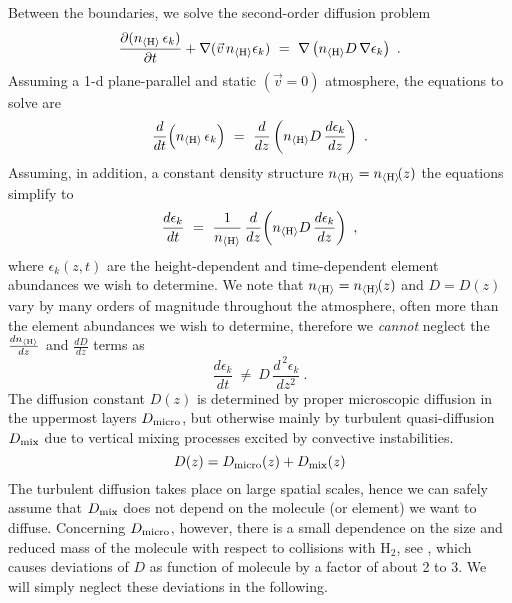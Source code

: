\documentclass[11pt]{article}
\def\nH{n_{\langle\rm H\rangle}}
\def\ek{\epsilon_k}
\def\pdiff#1#2{\frac{\partial #1}{\partial #2}}
\begin{document}
Between the boundaries, we solve the second-order diffusion problem
\begin{equation}
  \pdiff{(\nH\,\ek)}{t} + \nabla(\vec{v}\,\nH\ek) 
   ~=~ \nabla\left(\nH D\,\nabla\ek\right) \ .
\end{equation}
Assuming a 1-d plane-parallel and static $(\vec{v}=0)$ atmosphere, the
equations to solve are
\begin{equation}
  \frac{d}{dt}\Big(\nH\,\ek\Big) 
  ~=~ \frac{d}{dz}\left(\nH D\,\frac{d\ek}{dz}\right) \ .
  \label{eq:diff1}
\end{equation}
Assuming, in addition, a constant density structure
$\nH=\nH\!(z)$ the equations simplify to
\begin{equation}
  \frac{d\ek}{dt} 
  ~=~ \frac{1}{\nH}\,\frac{d}{dz}\!\left(\nH D\,\frac{d\ek}{dz}\right) \ ,
  \label{eq:diff2}
\end{equation}
where $\ek(z,t)$ are the height-dependent and time-dependent element
abundances we wish to determine. We note that $\nH=\nH\!(z)$ and
$D=D(z)$ vary by many orders of magnitude throughout the atmosphere,
often more than the element abundances we wish to determine, therefore 
we {\sl cannot} neglect the $\frac{d\nH}{dz}$ and $\frac{dD}{dz}$
terms as
\begin{equation}
  \frac{d\ek}{dt} ~\neq~ D\,\frac{d^{\,2}\ek}{dz^2} \ .
\end{equation}
The diffusion constant $D(z)$ is determined by proper microscopic diffusion
in the uppermost layers $D_{\rm micro}$, but otherwise mainly by
turbulent quasi-diffusion $D_{\rm mix}$ due to vertical mixing
processes excited by convective instabilities. 
\begin{equation}
  D(z) = D_{\rm micro}(z) + D_{\rm mix}(z)
\end{equation}
The turbulent diffusion takes place on large spatial scales, hence we
can safely assume that $D_{\rm mix}$ does not depend on the molecule
(or element) we want to diffuse. Concerning $D_{\rm micro}$, however, 
there is a small dependence on the size and reduced mass of the
molecule with respect to collisions with H$_2$, see
\citet[][Eq.~(26) therein]{Woitke2003}, which causes deviations
of $D$ as function of molecule by a factor of about 2 to 3. We will simply
neglect these deviations in the following.
\end{document}
